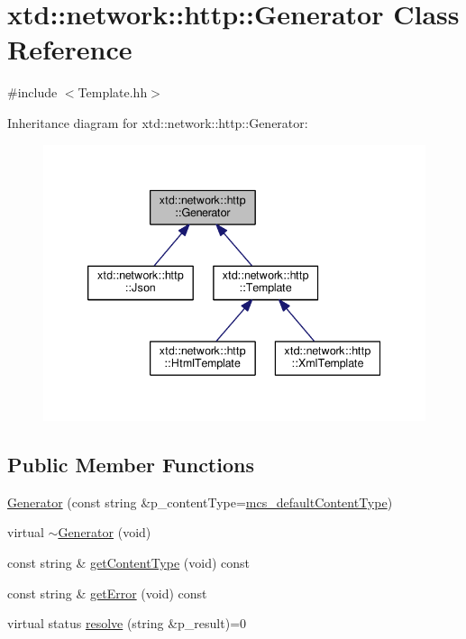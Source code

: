 \hypertarget{classxtd_1_1network_1_1http_1_1Generator}{}\section{xtd\+:\+:network\+:\+:http\+:\+:Generator Class Reference}
\label{classxtd_1_1network_1_1http_1_1Generator}


{\ttfamily \#include $<$Template.\+hh$>$}



Inheritance diagram for xtd\+:\+:network\+:\+:http\+:\+:Generator\+:
\nopagebreak
\begin{figure}[H]
\begin{center}
\leavevmode
\includegraphics[width=339pt]{classxtd_1_1network_1_1http_1_1Generator__inherit__graph}
\end{center}
\end{figure}
\subsection*{Public Member Functions}
\begin{DoxyCompactItemize}
\item 
\hyperlink{classxtd_1_1network_1_1http_1_1Generator_a5f8bfffa6c7fe8ae46158e976af3d666}{Generator} (const string \&p\+\_\+content\+Type=\hyperlink{classxtd_1_1network_1_1http_1_1Generator_aef564fc3152e7477bb429e45b19328fc}{mcs\+\_\+default\+Content\+Type})
\item 
virtual \hyperlink{classxtd_1_1network_1_1http_1_1Generator_a1d1e0656a6ffeecd718230613681c56d}{$\sim$\+Generator} (void)
\item 
const string \& \hyperlink{classxtd_1_1network_1_1http_1_1Generator_a4052d01b0d4849321b61688eac757b41}{get\+Content\+Type} (void) const 
\item 
const string \& \hyperlink{classxtd_1_1network_1_1http_1_1Generator_ac4fa462833bedc8bde7c7e81b1a29f37}{get\+Error} (void) const 
\item 
virtual status \hyperlink{classxtd_1_1network_1_1http_1_1Generator_a20ee788dc76ee76f4be5f44091b655ca}{resolve} (string \&p\+\_\+result)=0
\end{DoxyCompactItemize}
